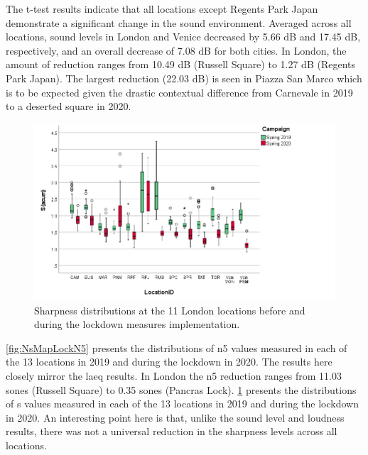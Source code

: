 
The t-test results indicate that all locations except Regents Park Japan demonstrate a significant change in the sound environment. Averaged across all locations, sound levels in London and Venice decreased by 5.66 dB and 17.45 dB, respectively, and an overall decrease of 7.08 dB for both cities. In London, the amount of reduction ranges from 10.49 dB (Russell Square) to 1.27 dB (Regents Park Japan). The largest reduction (22.03 dB) is seen in Piazza San Marco which is to be expected given the drastic contextual difference from Carnevale in 2019 to a deserted square in 2020. 

\begin{figure}[h]
  \centering
  \includegraphics[width=.75\textwidth]{Figures/LockdownSharp.png}
  \caption{Sharpness distributions at the 11 London locations before and during the lockdown measures implementation. \label{fig:NsMapLockS}}
\end{figure}

\cref{fig:NsMapLockN5} presents the distributions of \gls{n5} values measured in each of the 13 locations in 2019 and during the lockdown in 2020. The results here closely mirror the \gls{laeq} results. In London the \gls{n5} reduction ranges from 11.03 sones (Russell Square) to 0.35 sones (Pancras Lock). \cref{fig:NsMapLockS} presents the distributions of \gls{s} values measured in each of the 13 locations in 2019 and during the lockdown in 2020. An interesting point here is that, unlike the sound level and loudness results, there was not a universal reduction in the sharpness levels across all locations.

